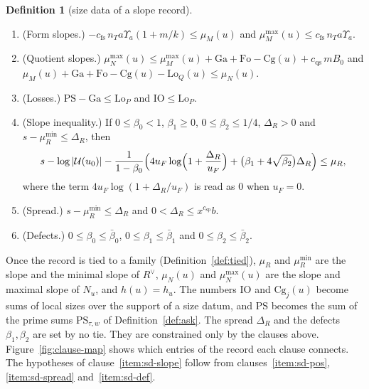 \documentclass[11pt]{amsbook}
\theoremstyle{plain}
\theoremstyle{definition}
\newtheorem{definition}[theorem]{Definition}
\theoremstyle{remark}
\numberwithin{equation}{section}
\numberwithin{figure}{chapter}
\numberwithin{table}{chapter}
\newcommand{\PS}{\mathrm{PS}}
\newcommand{\Words}{\mathcal{U}}
\newcommand{\Cg}{\mathrm{Cg}}
\newcommand{\lgv}{\operatorname{lg}}
\newcommand{\Fo}{\mathrm{Fo}}
\newcommand{\Ga}{\mathrm{Ga}}
\newcommand{\IO}{\mathrm{IO}}
\newcommand{\Lo}{\mathrm{Lo}}
\begin{document}
\begin{definition}[size data of a slope record]
\begin{enumerate}[label=(\arabic*)]
\begin{enumerate}[label=(\roman*)]
\[
\sum_{j<m}\frac1f\sum_{\rho<f}\log\frac{w(u_0,j,\rho)\,v}{\pi}
+m\lgv-c_{\mathrm{ct}}\Bigl(\Upsilon_a+\frac{m^2\Upsilon_a}{k}\Bigr)
\le\log T(u)\le c_{\mathrm{ct}}\,m\Upsilon,
\]
and $|\log T(u)-\log T(u')|\le c_{\mathrm{ct}}\log k$.
\item\label{item:sd-fs}
(Form slopes.) $-c_{\mathrm{fs}}\,n_Ta\Upsilon_a(1+m/k)\le
\mu_M(u)$ and $\mu_M^{\max}(u)\le c_{\mathrm{fs}}\,n_Ta\Upsilon_a$.
\item\label{item:sd-qs}
(Quotient slopes.) $\mu_N^{\max}(u)\le\mu_M^{\max}(u)+\Ga+\Fo
-\Cg(u)+c_{\mathrm{qs}}\,mB_0$ and
$\mu_M(u)+\Ga+\Fo-\Cg(u)-\Lo_Q(u)\le\mu_N(u)$.
\item\label{item:sd-loss} (Losses.) $\PS-\Ga\le\Lo_P$ and $\IO\le\Lo_P$.
\item\label{item:sd-slope}
(Slope inequality.) If $0\le\beta_0<1$, $\beta_1\ge0$,
$0\le\beta_2\le1/4$, $\Delta_R>0$ and $s-\mu_R^{\min}\le\Delta_R$, then
\[
s-\log|\Words(u_0)|-\frac{1}{1-\beta_0}\Bigl(4u_F\log\Bigl(1+
\frac{\Delta_R}{u_F}\Bigr)+\bigl(\beta_1+4\sqrt{\beta_2}\bigr)\Delta_R
\Bigr)\le\mu_R,
\]
where the term $4u_F\log(1+\Delta_R/u_F)$ is read as $0$ when
$u_F=0$.
\item\label{item:sd-spread} (Spread.) $s-\mu_R^{\min}\le\Delta_R$ and
$0<\Delta_R\le x^{c_{\mathrm{sp}}}b$.
\item\label{item:sd-def} (Defects.) $0\le\beta_0\le\bar\beta_0$,
$0\le\beta_1\le\bar\beta_1$ and $0\le\beta_2\le\bar\beta_2$.
\end{enumerate}
\end{enumerate}
\end{definition}

\noindent Once the record is tied to a family
(Definition~\ref{def:tied}), $\mu_R$ and $\mu_R^{\min}$ are the slope
and the minimal slope of $R^\vee$, $\mu_N(u)$ and $\mu_N^{\max}(u)$
are the slope and maximal slope of $N_u$, and $h(u)=h_u$. The numbers
$\IO$ and $\Cg_j(u)$ become sums of local sizes over the
support of a size datum, and $\PS$ becomes the sum of the prime sums
$\PS_{\tau,w}$ of Definition~\ref{def:ask}. The spread $\Delta_R$ and
the defects $\beta_1,\beta_2$ are set by no tie. They are constrained
only by the clauses above. Figure~\ref{fig:clause-map} shows which entries of the record each clause connects. The hypotheses of clause~\ref{item:sd-slope} follow
from
clauses~\ref{item:sd-pos}, \ref{item:sd-spread} and~\ref{item:sd-def}.
\begin{figure}[tbp]
\centering

\end{figure}
\end{document}
